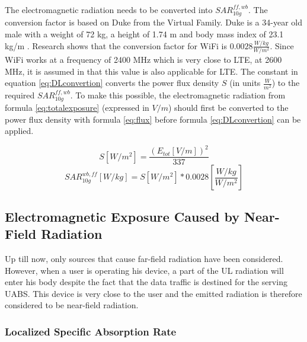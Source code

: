The electromagnetic radiation needs to be converted into $SAR^{ff,wb}_{10g}$. 
The conversion factor is based on Duke from the Virtual Family. Duke is a 34-year old male with a weight of 72 kg, a height of 1.74 m and body
mass index of 23.1 kg/m \cite{J22_plets2015joint}. Research shows that the conversion factor for WiFi is $0.0028 \frac{W/kg}{W/m^2}$.
 Since WiFi works at a frequency of 2400 MHz which 
is very close to LTE, at 2600 MHz, it is assumed in \cite{J22_plets2015joint} that this value is also applicable for \gls{LTE}.
The constant in equation \ref{eq:DLconvertion} converts the \gls{power flux density} $S$ (in units $\frac{W}{m^2}$) to the required $SAR^{ff,wb}_{10g}$.
To make this possible, the electromagnetic radiation
from formula \ref{eq:totalexposure} (expressed in  $V/m$) should first be converted to the  \gls{power flux density} with formula 
\ref{eq:flux} before formula \ref{eq:DLconvertion} can be applied.

\begin{equation}
S [W/m^2]= \frac{(E_{tot} [V/m])^2}{337}
\label{eq:flux}
\end{equation}
\begin{equation}
SAR^{wb,ff}_{10g} [W/kg]= S [W/m^2]* 0.0028  \left[\frac{W/kg}{W/m^2}\right]
\label{eq:DLconvertion}
\end{equation}

\subsection{Electromagnetic Exposure Caused by Near-Field Radiation}
\label{sub:Uplinkexposure}

Up till now, only sources that cause far-field radiation have been considered.
However, when a user is operating his device, a part of the \gls{UL} radiation will enter his body despite the fact 
that the  data traffic is destined for the serving \gls{UABS}. This device is very close to the user and the emitted 
radiation is therefore considered to be near-field radiation.

\subsubsection{Localized Specific Absorption Rate}

